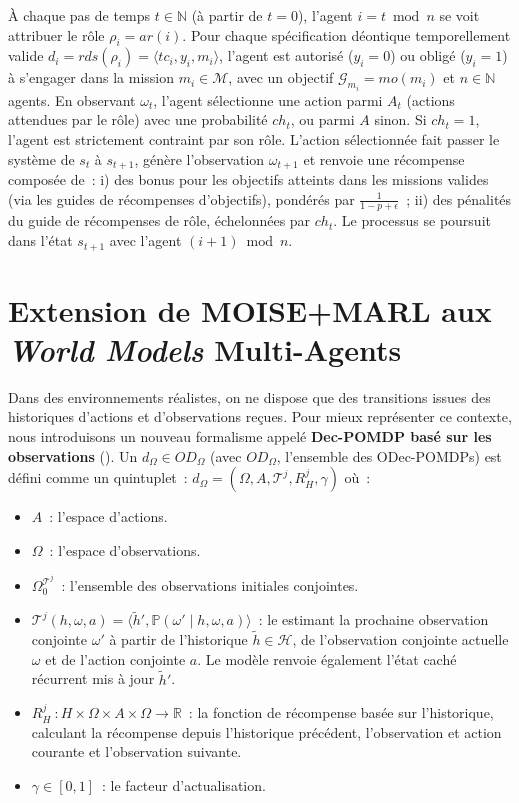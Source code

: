 À chaque pas de temps $t \in \mathbb{N}$ (à partir de $t=0$), l'agent $i = t \bmod n$ se voit attribuer le rôle $\rho_i = ar(i)$. Pour chaque spécification déontique temporellement valide $d_i = rds(\rho_i) = \langle tc_i, y_i, m_i \rangle$, l'agent est autorisé ($y_i = 0$) ou obligé ($y_i = 1$) à s'engager dans la mission $m_i \in \mathcal{M}$, avec un objectif $\mathcal{G}_{m_i} = mo(m_i)$ et $n \in \mathbb{N}$ agents.
%
En observant $\omega_t$, l'agent sélectionne une action parmi $A_t$ (actions attendues par le rôle) avec une probabilité $ch_t$, ou parmi $A$ sinon. Si $ch_t = 1$, l'agent est strictement contraint par son rôle.
%
L'action sélectionnée fait passer le système de $s_t$ à $s_{t+1}$, génère l'observation $\omega_{t+1}$ et renvoie une récompense composée de :
i) des bonus pour les objectifs atteints dans les missions valides (via les guides de récompenses d'objectifs), pondérés par $\frac{1}{1 - p + \epsilon}$ ;
ii) des pénalités du guide de récompenses de rôle, échelonnées par $ch_t$.
%
Le processus se poursuit dans l'état $s_{t+1}$ avec l'agent $(i + 1) \bmod n$.



\section{Extension de MOISE+MARL aux \textit{World Models} Multi-Agents}

\noindent Dans des environnements réalistes, on ne dispose que des transitions issues des historiques d'actions et d'observations reçues. Pour mieux représenter ce contexte, nous introduisons un nouveau formalisme appelé \textbf{Dec-POMDP basé sur les observations} (). Un  $d_\Omega \in OD_\Omega$ (avec $OD_\Omega$, l'ensemble des ODec-POMDPs) est défini comme un quintuplet~:
%
$d_\Omega = \left(\Omega, A, \mathcal{T}^j, R^j_H, \gamma \right)$
%
où~:
\begin{itemize}
  \item $A$~: l'espace d'actions.
  \item $\Omega$~: l'espace d'observations.
  \item $\Omega^{\mathcal{T}^j}_0$~: l'ensemble des observations initiales conjointes.
  \item $\mathcal{T}^j(h, \omega, a) = \langle \tilde{h}', \mathbb{P}(\omega' \mid h, \omega, a) \rangle$~: le  estimant la prochaine observation conjointe $\omega'$ à partir de l'historique $\tilde{h} \in \mathcal{H}$, de l'observation conjointe actuelle $\omega$ et de l'action conjointe $a$. Le modèle renvoie également l'état caché récurrent mis à jour $\tilde{h}'$.
  \item $R^j_H~: H \times \Omega \times A \times \Omega \rightarrow \mathbb{R}$~: la fonction de récompense basée sur l'historique, calculant la récompense depuis l'historique précédent, l'observation et action courante et l'observation suivante.
  \item $\gamma \in [0, 1]$~: le facteur d'actualisation.
\end{itemize}


